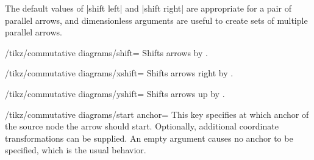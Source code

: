 \documentclass[a4paper]{ltxdoc}
\begin{document}
\begin{codeexample}[]
\end{codeexample}

The default values of |shift left| and |shift right| are appropriate
for a pair of parallel arrows, and dimensionless arguments are useful
to create sets of multiple parallel arrows.
\begin{codeexample}[]
\end{codeexample}

\begin{key}{/tikz/commutative diagrams/shift=}
  Shifts arrows by .
\end{key}

\begin{key}{/tikz/commutative diagrams/xshift=}
  Shifts arrows right by .
\end{key}

\begin{key}{/tikz/commutative diagrams/yshift=}
  Shifts arrows up by .
\end{key}

\begin{codeexample}[]
\end{codeexample}

\begin{key}{/tikz/commutative diagrams/start anchor=}
  This key specifies at which anchor of the source node the arrow
  should start.  Optionally, additional coordinate transformations can
  be supplied.  An empty  argument causes no anchor to be
  specified, which is the usual behavior.
\end{key}
\end{document}
